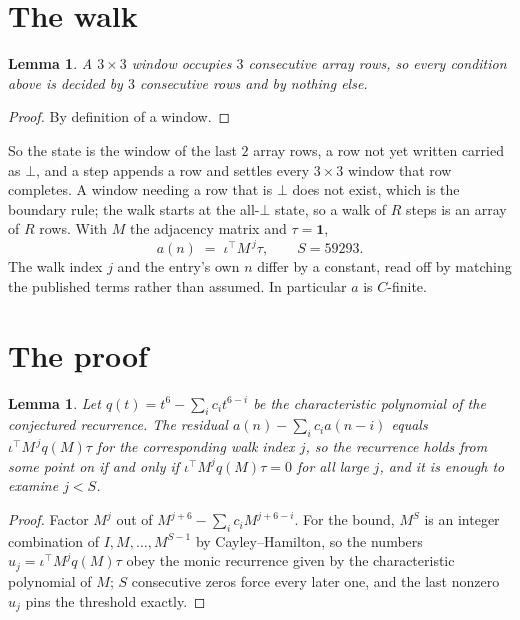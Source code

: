 \documentclass[11pt,a4paper]{article}
\theoremstyle{plain}
\newtheorem{lemma}[theorem]{Lemma}
\theoremstyle{definition}
\begin{document}
\section{The walk}

\begin{lemma}\label{lem:win}
A $3\times3$ window occupies $3$ consecutive array rows, so every condition above is
decided by $3$ consecutive rows and by nothing else.
\end{lemma}

\begin{proof}
By definition of a window.
\end{proof}

So the state is the window of the last $2$ array rows, a row not yet written carried as
$\bot$, and a step appends a row and settles every $3\times3$ window that row completes. A
window needing a row that is $\bot$ does not exist, which is the boundary rule; the walk starts
at the all-$\bot$ state, so a walk of $R$ steps is an array of $R$ rows. With $M$ the adjacency
matrix and $\tau=\mathbf{1}$,
\[
a(n)\;=\;\iota^{\!\top}M^{\,j}\tau ,\qquad S=59293.
\]
The walk index $j$ and the entry's own $n$ differ by a constant, read off by matching the
published terms rather than assumed. In particular $a$ is $C$-finite.

\section{The proof}

\begin{lemma}\label{lem:crit}
Let $q(t)=t^{6}-\sum_i c_it^{6-i}$ be the characteristic polynomial of the
conjectured recurrence. The residual $a(n)-\sum_ic_ia(n-i)$ equals
$\iota^{\!\top}M^{\,j}q(M)\tau$ for the corresponding walk index $j$, so the recurrence
holds from some point on if and only if $\iota^{\!\top}M^{j}q(M)\tau=0$ for all large $j$,
and it is enough to examine $j<S$.
\end{lemma}

\begin{proof}
Factor $M^{j}$ out of $M^{j+6}-\sum_ic_iM^{j+6-i}$. For the bound, $M^{S}$
is an integer combination of $I,M,\dots,M^{S-1}$ by Cayley--Hamilton, so the numbers
$u_j=\iota^{\!\top}M^{j}q(M)\tau$ obey the monic recurrence given by the characteristic
polynomial of $M$; $S$ consecutive zeros force every later one, and the last nonzero $u_j$
pins the threshold exactly.
\end{proof}
\end{document}
